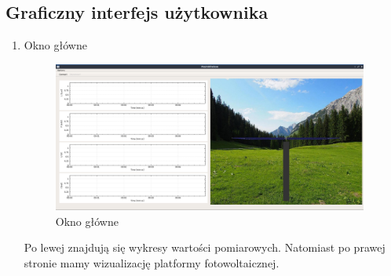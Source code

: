 \documentclass[10pt, a4paper]{article}
\begin{document}
	\subsection{Graficzny interfejs użytkownika}
		\begin{enumerate}
			\item Okno główne
				\begin{figure}[H]
					\centering
					\includegraphics[width=0.98\textwidth]{figures/okno_glowne1.png}
					\caption{Okno główne}
					\label{fig:okno_glowne1}
				\end{figure}
			Po lewej znajdują się wykresy wartości pomiarowych. Natomiast po prawej stronie mamy wizualizację platformy fotowoltaicznej.
					

\end{enumerate}
\end{document}
